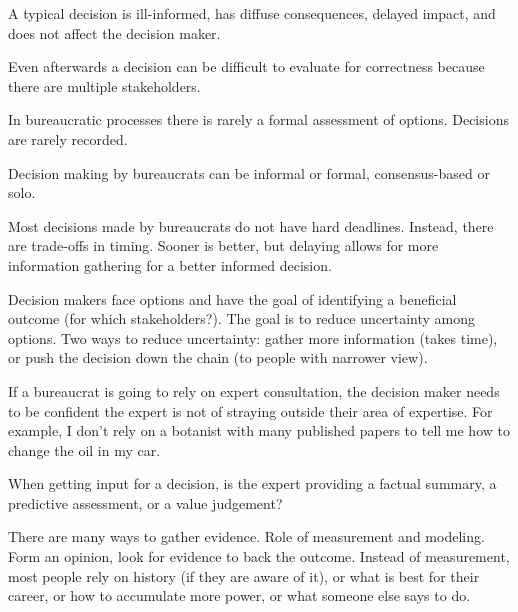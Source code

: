 A typical decision is ill-informed, has diffuse consequences, delayed impact, and does not affect the decision maker. 

Even afterwards a decision can be difficult to evaluate for correctness because there are multiple stakeholders.

In bureaucratic processes there is rarely a formal assessment of options. 
Decisions are rarely recorded. 

Decision making by bureaucrats can be informal or formal, consensus-based or solo. 

Most decisions made by bureaucrats do not have hard deadlines. Instead, there are trade-offs in timing. Sooner is better, but delaying allows for more information gathering for a better informed decision.




Decision makers face options and have the goal of identifying a beneficial outcome (for which stakeholders?). The goal is to reduce uncertainty among options. Two ways to reduce uncertainty: gather more information (takes time), or push the decision down the chain (to people with narrower view). 

If a bureaucrat is going to rely on expert consultation, the decision maker needs to be confident the expert is not of straying outside their area of expertise. For example, I don't rely on a botanist with many published papers to tell me how to change the oil in my car. 

When getting input for a decision, is the expert providing a factual summary, a predictive assessment, or a value judgement? 

There are many ways to gather evidence. 
Role of measurement and modeling. 
Form an opinion, look for evidence to back the outcome.
Instead of measurement, most people rely on history (if they are aware of it), or what is best for their career, or how to accumulate more power, or what someone else says to do.  
